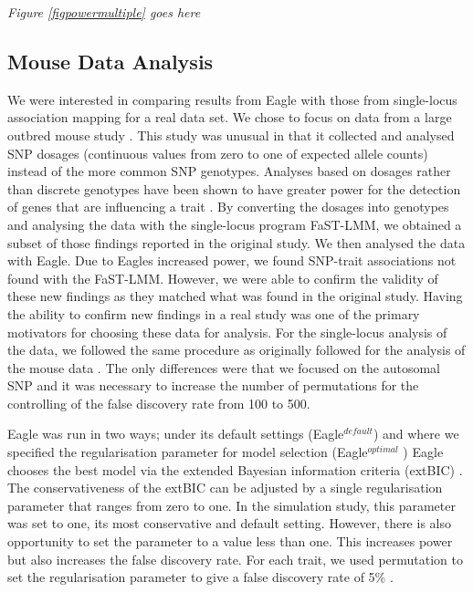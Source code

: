 \documentclass{nature}
\begin{document}
{\em Figure \ref{figpowermultiple} goes here}



\subsection{Mouse Data Analysis}

We were interested in comparing results from Eagle with those from single-locus association mapping for a real data set.
 We chose to focus on data from a large outbred mouse study \cite{nicod2016genome}. This study was unusual in that it collected and analysed SNP dosages (continuous values from zero to one of expected allele counts)  instead of the more common SNP genotypes. Analyses based on dosages rather than discrete genotypes have been shown to have greater power for the detection of genes that are influencing a trait  \cite{zheng2011comparison}. By converting the dosages into genotypes and analysing the data with the single-locus program FaST-LMM, we obtained a subset of those findings reported in the original study. We then analysed the data with Eagle. Due to Eagles increased power, we found SNP-trait associations not found with the FaST-LMM. However, we were 
 able to confirm the validity of these new findings as they matched what was found in the original study. Having the ability to confirm new findings 
 in a real study was 
 one of the primary motivators for choosing these data for analysis. 
For the single-locus analysis of the data, we followed the same procedure as originally followed for the analysis of the mouse data \cite{nicod2016genome}. The only differences were that we focused on the autosomal SNP and it was necessary to 
increase the number of permutations for the controlling of the false discovery rate from 100 to 500.

Eagle was run in two ways; under its default settings (Eagle$^{default}$) and where we specified the regularisation parameter for model selection (Eagle$^{optimal}$ ) Eagle chooses the best model via the extended Bayesian information criteria (extBIC) \cite{chen2008extended}. 
  The conservativeness of the extBIC can be adjusted by a single regularisation parameter that ranges from zero to one. In the simulation study, this parameter was set to one, its most conservative and default setting. However, there is also opportunity to set the parameter to a value less than one. This increases power but also increases the false discovery rate. For each trait, we used permutation to set the regularisation parameter to give a false discovery rate of 5\% .
\end{document}
